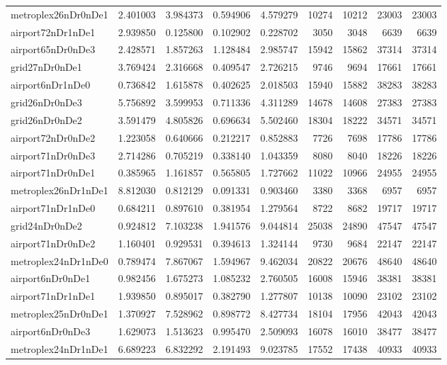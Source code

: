 \begin{longtable}{|l|r|r|r|r|r|r|r|r|}
metroplex26nDr0nDe1 & 2.401003 & 3.984373 & 0.594906 & 4.579279 & 10274 & 10212 & 23003 & 23003 \\
airport72nDr1nDe1 & 2.939850 & 0.125800 & 0.102902 & 0.228702 & 3050 & 3048 & 6639 & 6639 \\
airport65nDr0nDe3 & 2.428571 & 1.857263 & 1.128484 & 2.985747 & 15942 & 15862 & 37314 & 37314 \\
grid27nDr0nDe1 & 3.769424 & 2.316668 & 0.409547 & 2.726215 & 9746 & 9694 & 17661 & 17661 \\
airport6nDr1nDe0 & 0.736842 & 1.615878 & 0.402625 & 2.018503 & 15940 & 15882 & 38283 & 38283 \\
grid26nDr0nDe3 & 5.756892 & 3.599953 & 0.711336 & 4.311289 & 14678 & 14608 & 27383 & 27383 \\
grid26nDr0nDe2 & 3.591479 & 4.805826 & 0.696634 & 5.502460 & 18304 & 18222 & 34571 & 34571 \\
airport72nDr0nDe2 & 1.223058 & 0.640666 & 0.212217 & 0.852883 & 7726 & 7698 & 17786 & 17786 \\
airport71nDr0nDe3 & 2.714286 & 0.705219 & 0.338140 & 1.043359 & 8080 & 8040 & 18226 & 18226 \\
airport71nDr0nDe1 & 0.385965 & 1.161857 & 0.565805 & 1.727662 & 11022 & 10966 & 24955 & 24955 \\
metroplex26nDr1nDe1 & 8.812030 & 0.812129 & 0.091331 & 0.903460 & 3380 & 3368 & 6957 & 6957 \\
airport71nDr1nDe0 & 0.684211 & 0.897610 & 0.381954 & 1.279564 & 8722 & 8682 & 19717 & 19717 \\
grid24nDr0nDe2 & 0.924812 & 7.103238 & 1.941576 & 9.044814 & 25038 & 24890 & 47547 & 47547 \\
airport71nDr0nDe2 & 1.160401 & 0.929531 & 0.394613 & 1.324144 & 9730 & 9684 & 22147 & 22147 \\
metroplex24nDr1nDe0 & 0.789474 & 7.867067 & 1.594967 & 9.462034 & 20822 & 20676 & 48640 & 48640 \\
airport6nDr0nDe1 & 0.982456 & 1.675273 & 1.085232 & 2.760505 & 16008 & 15946 & 38381 & 38381 \\
airport71nDr1nDe1 & 1.939850 & 0.895017 & 0.382790 & 1.277807 & 10138 & 10090 & 23102 & 23102 \\
metroplex25nDr0nDe1 & 1.370927 & 7.528962 & 0.898772 & 8.427734 & 18104 & 17956 & 42043 & 42043 \\
airport6nDr0nDe3 & 1.629073 & 1.513623 & 0.995470 & 2.509093 & 16078 & 16010 & 38477 & 38477 \\
metroplex24nDr1nDe1 & 6.689223 & 6.832292 & 2.191493 & 9.023785 & 17552 & 17438 & 40933 & 40933 \\

\end{longtable}
